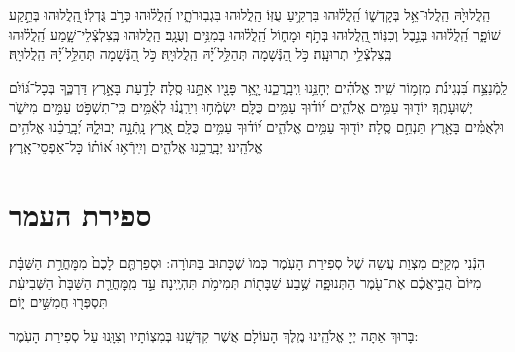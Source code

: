 \documentclass[twoside, openany, parskip=half, 11pt]{book}
\begin{document}
  הַֽלֲלוּיָ֙הּ
   הַֽלֲלוּ־אֵ֥ל בְּקָדְשׁ֑וֹ הַֽ֝לֲל֗וּהוּ בִּרְקִ֥יעַ עֻזּֽוֹ׃ 
הַֽלֲלוּהוּ בִּגְבֽוּרֹתָ֑יו הַֽ֝לֲל֗וּהוּ כְּרֹ֣ב גֻּדְלֽוֹ׃ 
֖הַֽלֲלוּהוּ בְּתֵ֣קַע שׁוֹפָ֑ר הַֽ֝לֲל֗וּהוּ בְּנֵ֣בֶל וְכִנּֽוֹר׃ 
֖הַֽלֲלוּהוּ בְּתֹ֣ף וּמָח֑וֹל הַֽ֝לֲל֗וּהוּ בְּמִנִּ֥ים וְעֻגָֽב׃ 
הַֽלֲלוּהוּ בְּֽצִלְצְֿלֵי־שָׁ֑מַע הַֽ֝לֲל֗וּהוּ בְּֽצִלְצְֿלֵ֥י תְרוּעָֽה׃ 
 כֹּ֣ל הַ֭נְּֿשָׁמָה תְּהַלֵּ֥ל ֝יָ֗הּ הַֽלֲלוּיָֽהּ׃
 כֹּ֣ל הַ֭נְּֿשָׁמָה תְּהַלֵּ֥ל ֝יָ֗הּ הַֽלֲלוּיָֽהּ׃

\enlargethispage{\baselineskip}
  לַֽמְֿנַצֵּ֥ח
   בִּ֝נְגִינֹ֗ת מִזְמ֥וֹר שִֽׁיר׃ אֱלֹהִ֗ים יְחָנֵּ֥נוּ וִֽיבָֽרֲכֵ֑נוּ יָ֤אֵ֥ר פָּנָ֖יו אִתָּ֣נוּ סֶֽלָה׃ לָדַ֣עַת בָּאָ֣רֶץ דַּרְכֶּ֑ךָ בְּכָל־גּ֝וֹיִ֗ם יְשֽׁוּעָתֶֽךָ׃ יוֹד֖וּךָ עַמִּ֥ים אֱלֹהִ֑ים י֝וֹד֗וּךָ עַמִּ֥ים כֻּלָּֽם׃ יִשְׂמְֿח֥וּ וִירַֽנֲנ֗וּ לְאֻ֫מִּ֥ים כִּֽי־תִשְׁפֹּ֣ט עַמִּ֣ים מִישֹׁ֑ר וּלְאֻמִּ֓ים בָּאָ֖רֶץ תַּנְחֵ֣ם סֶֽלָה׃ יוֹד֖וּךָ עַמִּ֥ים אֱלֹהִ֑ים י֝וֹד֗וּךָ עַמִּ֥ים כֻּלָּֽם׃ אֶ֭רֶץ נָֽתְֿנָ֣ה יְבוּלָ֑הּ יְ֝בָֽרֲכֵ֗נוּ אֱלֹהִ֥ים אֱלֹהֵֽינוּ׃ יְבָֽרֲכֵ֥נוּ אֱלֹהִ֑ים וְיִֽירְֿא֥וּ א֝וֹת֗וֹ כָּל־אַפְסֵי־אָֽרֶץ׃ 

 

\label{sefiras haomer}
\section[ספירת העמר]{ ספירת העמר }


הִנְֿנִי מְקַיֵּם מִצְוַת עֲשֵה שֶׁל סְפִירַת הָעֽׂמֶר כְּמוׂ שֶׁכָּתוּב בַּתּוׂרָה:
וּסְפַרְתֶּ֤ם
 לָכֶם֙ מִמׇּחֳרַ֣ת הַשַּׁבָּ֔ת מִיּוֹם֙ הֲבִ֣יאֲכֶ֔ם אֶת־עֹ֖מֶר הַתְּנוּפָ֑ה שֶׁ֥בַע שַׁבָּת֖וֹת תְּמִימֹ֥ת תִּהְיֶֽינָה׃ עַ֣ד מִֽמׇּחֳרַ֤ת הַשַּׁבָּת֙ הַשְּׁבִיעִ֔ת תִּסְפְּר֖וּ חֲמִשִּׁ֣ים י֑וֹם׃

בָּרוּךְ אַתָּה יְיָ אֱלֹהֵֽינוּ מֶֽלֶךְ הָעוֹלָם אֲשֶׁר קִדְּשָֽׁנוּ בְּמִצְוֹתָיו וְצִוָּֽנוּ עַל סְפִירַת הָעֹֽמֶר:
\end{document}
